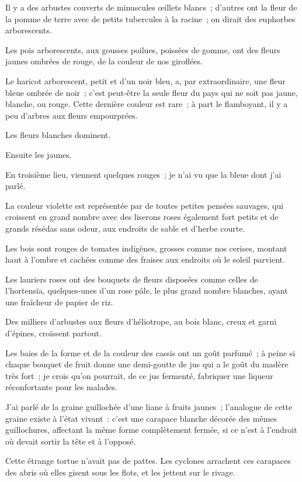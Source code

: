 \documentclass[french,twoside]{book} %
\begin{document}
Il y a des arbustes couverts de minuscules œillets blancs ; d’autres ont la fleur de la pomme de terre avec de petits tubercules à la racine ; on dirait des euphorbes arborescents.\par
Les pois arborescents, aux gousses poilues, poissées de gomme, ont des fleurs jaunes ombrées de rouge, de la couleur de nos giroflées.\par
Le haricot arborescent, petit et d’un noir bleu, a, par extraordinaire, une fleur bleue ombrée de noir ; c’est peut-être la seule fleur du pays qui ne soit pas jaune, blanche, ou rouge. Cette dernière couleur est rare ; à part le flamboyant, il y a peu d’arbres aux fleurs empourprées.\par
Les fleurs blanches dominent.\par
Ensuite les jaunes.\par
En troisième lieu, viennent quelques rouges ; je n’ai vu que la bleue dont j’ai parlé.\par
La couleur violette est représentée par de toutes petites pensées sauvages, qui croissent en grand nombre avec des liserons roses également fort petits et de grands résédas sans odeur, aux endroits de sable et d’herbe courte.\par
Les bois sont rouges de tomates indigènes, grosses comme nos cerises, montant haut à l’ombre  et cachées comme des fraises aux endroits où le soleil parvient.\par
Les lauriers roses ont des bouquets de fleurs disposées comme celles de l’hortensia, quelques-unes d’un rose pâle, le plus grand nombre blanches, ayant une fraîcheur de papier de riz.\par
Des milliers d’arbustes aux fleurs d’héliotrope, au bois blanc, creux et garni d’épines, croissent partout.\par
Les baies de la forme et de la couleur des cassis ont un goût parfumé ; à peine si chaque bouquet de fruit donne une demi-goutte de jus qui a le goût du madère très fort ; je crois qu’on pourrait, de ce jus fermenté, fabriquer une liqueur réconfortante pour les malades.\par
J’ai parlé de la graine guillochée d’une liane à fruits jaunes ; l’analogue de cette graine existe à l’état vivant : c’est une carapace blanche décorée des mêmes guillochures, affectant la même forme complètement fermée, si ce n’est à l’endroit où devait sortir la tête et à l’opposé.\par
Cette étrange tortue n’avait pas de pattes. Les cyclones arrachent ces carapaces des abris où elles gisent sous les flots, et les jettent sur le rivage.\par
\end{document}
